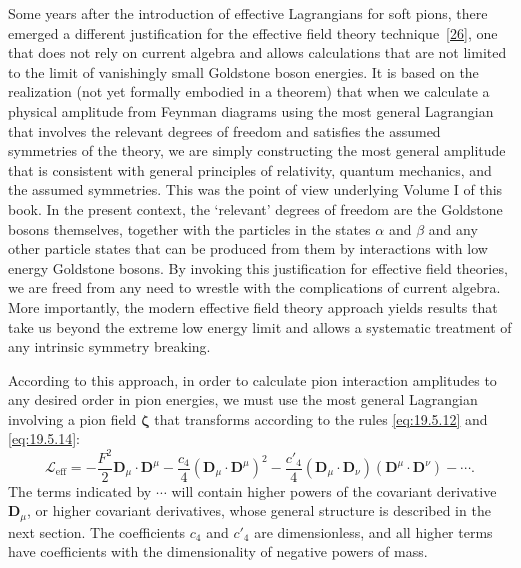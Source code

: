 Some years after the introduction of effective Lagrangians for soft pions, there emerged a different justification for the effective field theory technique~\hyperref[ch19-ref-26]{[26]}, one that does not rely on current algebra and allows calculations that are not limited to the limit of vanishingly small Goldstone boson energies. It is based on the realization (not yet formally embodied in a theorem) that when we calculate a physical amplitude from Feynman diagrams using the most general Lagrangian that involves the relevant degrees of freedom and satisfies the assumed symmetries of the theory, we are simply constructing the most general amplitude that is consistent with general principles of relativity, quantum mechanics, and the assumed symmetries. This was the point of view underlying Volume I of this book. In the present context, the `relevant' degrees of freedom are the Goldstone bosons themselves, together with the particles in the states $\alpha$ and $\beta$ and any other particle states that can be produced from them by interactions with low energy Goldstone bosons. By invoking this justification for effective field theories, we are freed from any need to wrestle with the complications of current algebra. More importantly, the modern effective field theory approach yields results that take us beyond the extreme low energy limit and allows a systematic treatment of any intrinsic symmetry breaking.

According to this approach, in order to calculate pion interaction amplitudes to any desired order in pion energies, we must use the most general Lagrangian involving a pion field $\boldsymbol{\zeta}$ that transforms according to the rules \eqref{eq:19.5.12} and \eqref{eq:19.5.14}:
\begin{equation}
\mathcal L_{\mathrm{eff}}
=-\frac{F^2}{2}\boldsymbol D_\mu\cdot\boldsymbol D^\mu
-\frac{c_4}{4}(\boldsymbol D_\mu\cdot\boldsymbol D^\mu)^2
-\frac{c'_4}{4}
(\boldsymbol D_\mu\cdot\boldsymbol D_\nu)
(\boldsymbol D^\mu\cdot\boldsymbol D^\nu)-\cdots.
\tag{19.5.19}\label{eq:19.5.19}
\end{equation}
The terms indicated by $\cdots$ will contain higher powers of the covariant derivative $\boldsymbol D_\mu$, or higher covariant derivatives, whose general structure is described in the next section. The coefficients $c_4$ and $c'_4$ are dimensionless, and all higher terms have coefficients with the dimensionality of negative powers of mass.

